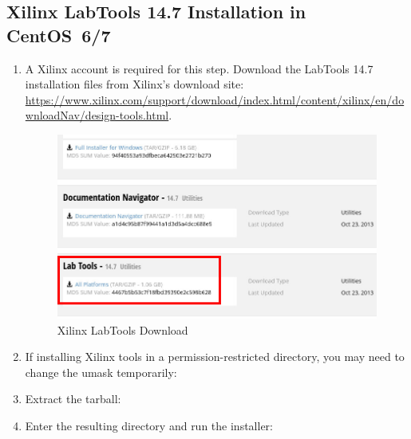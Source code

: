 \begin{flushleft}
\subsection{Xilinx LabTools 14.7 Installation in CentOS~6/7}
\label{sec:labtools}
\begin{flushleft}
\begin{enumerate}
\item A Xilinx account is required for this step. Download the LabTools 14.7 installation files from Xilinx's download site:
\url{https://www.xilinx.com/support/download/index.html/content/xilinx/en/downloadNav/design-tools.html}.
\begin{figure}[H]
	\centerline{\includegraphics[scale=0.4]{figures/xilinx_labtools_download}}
	\caption{Xilinx LabTools Download}
\end{figure}
\item If installing Xilinx tools in a permission-restricted directory, you may need to change the umask temporarily:\newline
{}\newline
{}
\item Extract the tarball:\newline
{}
\item Enter the resulting directory and run the installer:\newline
{}\newline
{}\newline
\pagebreak


\end{enumerate}
\end{flushleft}
\end{flushleft}

